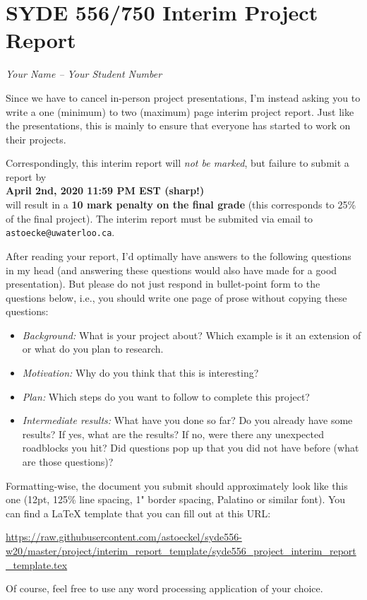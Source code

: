 \documentclass[12pt,letterpaper,oneside]{article}
\begin{document}
	\section*{SYDE 556/750 Interim Project Report}

	\emph{Your Name -- Your Student Number}

	Since we have to cancel in-person project presentations, I'm instead asking you to write a one (minimum) to two (maximum) page interim project report. Just like the presentations, this is mainly to ensure that everyone has started to work on their projects.

	Correspondingly, this interim report will \emph{not be marked}, but failure to submit a report by\\[0.25cm]
	{\centering\bf April 2nd, 2020 11:59 PM EST (sharp!)\\[0.25cm]}
	will result in a \textbf{10 mark penalty on the final grade} (this corresponds to 25\% of the final project). The interim report must be submited via email to \texttt{astoecke@uwaterloo.ca}.

	After reading your report, I'd optimally have answers to the following questions in my head (and answering these questions would also have made for a good presentation). But please do not just respond in bullet-point form to the questions below, i.e., you should write one page of prose without copying these questions:
	\begin{itemize}
		\item \emph{Background:} What is your project about? Which example is it an extension of or what do you plan to research.
		\item \emph{Motivation:} Why do you think that this is interesting?
		\item \emph{Plan:} Which steps do you want to follow to complete this project?
		\item \emph{Intermediate results:} What have you done so far? Do you already have some results? If yes, what are the results? If no, were there any unexpected roadblocks you hit? Did questions pop up that you did not have before (what are those questions)?
	\end{itemize}

	Formatting-wise, the document you submit should approximately look like this one (12pt, 125\% line spacing, 1" border spacing, Palatino or similar font). You can find a LaTeX template that you can fill out at this URL:
	\begin{center}
		\small
		\url{https://raw.githubusercontent.com/astoeckel/syde556-w20/master/project/interim_report_template/syde556_project_interim_report_template.tex}
	\end{center}

	Of course, feel free to use any word processing application of your choice.
\end{document}
